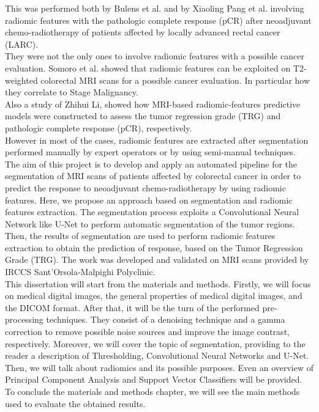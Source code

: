\documentclass{standalone}
\begin{document}
This was performed both by Bulens et al.\cite{Bulens} and by Xiaoling Pang et al.\cite{XiaolingPang} involving radiomic features with the pathologic complete response (pCR) after neoadjuvant chemo-radiotherapy of patients affected by locally advanced rectal cancer (LARC).
\\
They were not the only ones to involve radiomic features with a possible cancer evaluation.
Somoro et al. \cite{haralick} showed that radiomic features can be exploited on T2-weighted colorectal MRI scans for a possible cancer evaluation. 
In particular how they correlate to Stage Malignancy.
\\
Also a study of Zhihui Li\cite{ZhihuiLi}, showed how MRI-based radiomic-features predictive models were constructed to assess the tumor regression grade (TRG) and pathologic complete response (pCR), respectively.
\\
However in most of the cases, radiomic features are extracted after segmentation performed manually by expert operators or by using semi-manual techniques. 
\\
The aim of this project is to develop and apply an automated pipeline for the segmentation of MRI scans of patients affected by colorectal cancer in order to predict the response to neoadjuvant chemo-radiotherapy by using radiomic features. 
Here, we propose an approach based on segmentation and radiomic features extraction.
The segmentation process exploits a Convolutional Neural Network like U-Net to perform automatic segmentation of the tumor regions.
Then, the results of segmentation are used to perform radiomic features extraction to obtain the prediction of response, based on the Tumor Regression Grade (TRG).
The work was developed and validated on MRI scans provided by IRCCS Sant’Orsola-Malpighi Polyclinic.
\\
This dissertation will start from the materials and methods.
Firstly, we will focus on medical digital images, the general properties of medical digital images, and the DICOM format.
After that, it will be the turn of the performed pre-processing techniques.
They consist of a denoising technique and a gamma correction to remove possible noise sources and improve the image contrast, respectively.
Moreover, we will cover the topic of segmentation, providing to the reader a description of Thresholding, Convolutional Neural Networks and U-Net.
Then, we will talk about radiomics and its possible purposes.
Even an overview of Principal Component Analysis and Support Vector Classifiers will be provided.
To conclude the materials and methods chapter, we will see the main methods used to evaluate the obtained results.
\end{document}
